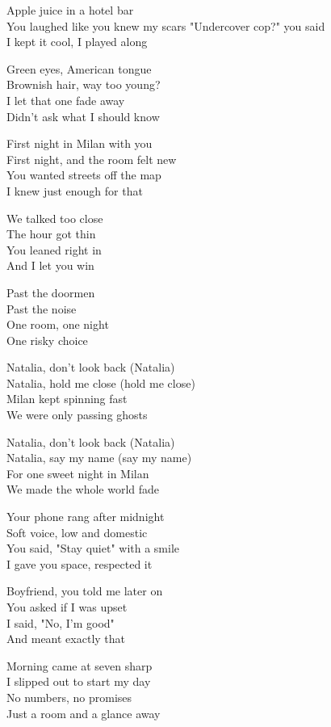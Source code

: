 \begin{lyrics}
Apple juice in a hotel bar\\
You laughed like you knew my scars
"Undercover cop?" you said\\
I kept it cool, I played along

Green eyes, American tongue\\
Brownish hair, way too young?\\
I let that one fade away\\
Didn’t ask what I should know

First night in Milan with you\\
First night, and the room felt new\\
You wanted streets off the map\\
I knew just enough for that

We talked too close\\
The hour got thin\\
You leaned right in\\
And I let you win

Past the doormen\\
Past the noise\\
One room, one night\\
One risky choice

Natalia, don’t look back (Natalia)\\
Natalia, hold me close (hold me close)\\
Milan kept spinning fast\\
We were only passing ghosts

Natalia, don’t look back (Natalia)\\
Natalia, say my name (say my name)\\
For one sweet night in Milan\\
We made the whole world fade

Your phone rang after midnight\\
Soft voice, low and domestic\\
You said, "Stay quiet" with a smile\\
I gave you space, respected it

Boyfriend, you told me later on\\
You asked if I was upset\\
I said, "No, I’m good"\\
And meant exactly that

Morning came at seven sharp\\
I slipped out to start my day\\
No numbers, no promises\\
Just a room and a glance away


\end{lyrics}
